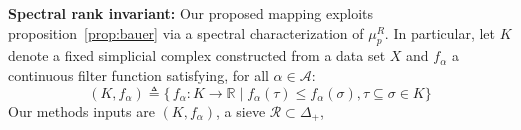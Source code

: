 \documentclass[10pt twocolumn]{article}
\numberwithin{equation}{section}
\newcommand{\+}{%
	\raisebox{0.18ex}{\scaleobj{0.55}{+}}
}
\theoremstyle{definition}
\theoremstyle{definition}
\begin{document}
\begin{multicols}{2}
\noindent 
\textbf{Spectral rank invariant: }
Our proposed mapping exploits proposition~\ref{prop:bauer} via a spectral characterization of $\mu_p^R$. 
In particular, let $K$ denote a fixed simplicial complex constructed from a data set $X$ and $f_\alpha$ a continuous filter function satisfying, for all $\alpha \in \mathcal{A}$:
	\begin{equation*}
		(K, f_\alpha) \triangleq \{ \, f_\alpha : K \to \mathbb{R} \mid f_\alpha(\tau) \leq f_\alpha(\sigma)  , \tau \subseteq \sigma \in K\}
	\end{equation*}
Our methods inputs are $(K, f_\alpha)$, a sieve $\mathcal{R} \subset \Delta_+$,

\end{multicols}
\end{document}
